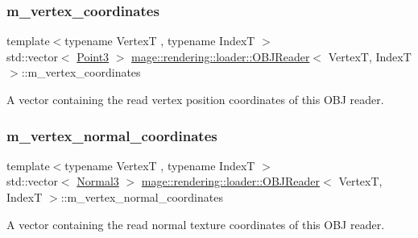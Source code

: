 \subsubsection{\texorpdfstring{m\+\_\+vertex\+\_\+coordinates}{m\_vertex\_coordinates}}
{\footnotesize\ttfamily template$<$typename VertexT , typename IndexT $>$ \\
std\+::vector$<$ \hyperlink{structmage_1_1_point3}{Point3} $>$ \hyperlink{classmage_1_1rendering_1_1loader_1_1_o_b_j_reader}{mage\+::rendering\+::loader\+::\+O\+B\+J\+Reader}$<$ VertexT, IndexT $>$\+::m\+\_\+vertex\+\_\+coordinates\hspace{0.3cm}{\ttfamily [private]}}

A vector containing the read vertex position coordinates of this O\+BJ reader. \hypertarget{classmage_1_1rendering_1_1loader_1_1_o_b_j_reader_ac977ade8154bef446524526e8297f3eb}{}\label{classmage_1_1rendering_1_1loader_1_1_o_b_j_reader_ac977ade8154bef446524526e8297f3eb} 
\subsubsection{\texorpdfstring{m\+\_\+vertex\+\_\+normal\+\_\+coordinates}{m\_vertex\_normal\_coordinates}}
{\footnotesize\ttfamily template$<$typename VertexT , typename IndexT $>$ \\
std\+::vector$<$ \hyperlink{structmage_1_1_normal3}{Normal3} $>$ \hyperlink{classmage_1_1rendering_1_1loader_1_1_o_b_j_reader}{mage\+::rendering\+::loader\+::\+O\+B\+J\+Reader}$<$ VertexT, IndexT $>$\+::m\+\_\+vertex\+\_\+normal\+\_\+coordinates\hspace{0.3cm}{\ttfamily [private]}}

A vector containing the read normal texture coordinates of this O\+BJ reader. \hypertarget{classmage_1_1rendering_1_1loader_1_1_o_b_j_reader_aed919290e638cbe00a9144fdcb652178}{}\label{classmage_1_1rendering_1_1loader_1_1_o_b_j_reader_aed919290e638cbe00a9144fdcb652178} 
